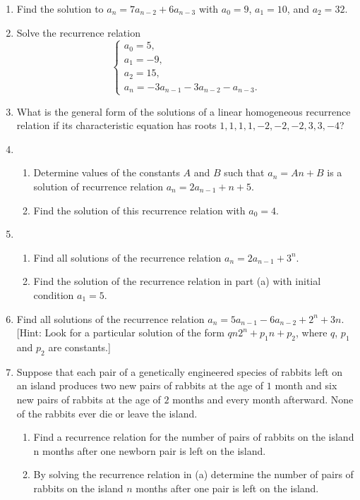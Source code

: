 \documentclass{../../cls/sig-alternate-05-2015}
\begin{document}
\begin{enumerate}
\item
Find the solution to $a_n=7a_{n-2}+6a_{n-3}$ with $a_0=9$, $a_1 = 10$, and $a_2=32$.

\item Solve the recurrence relation \begin{equation}
\begin{cases}
a_0 = 5,\\
a_1 = -9,\\
a_2 = 15,\\
a_n = -3a_{n-1} - 3a_{n-2} - a_{n-3}.
\end{cases}
\end{equation}

\item What is the general form of the solutions of a linear homogeneous recurrence relation if its characteristic equation
has roots $1, 1, 1, 1, -2, -2, -2, 3, 3, -4$?

\item \begin{enumerate}
    \item Determine values of the constants $A$ and $B$ such
    that $a_n = An + B$ is a solution of recurrence relation $a_n = 2a_{n - 1} + n + 5$.
    \item Find the solution of this recurrence relation with
    $a_0 = 4$.
\end{enumerate}

\item \begin{enumerate}
    \item Find all solutions of the recurrence relation
    $a_n = 2a_{n-1} + 3^n$.
    \item Find the solution of the recurrence relation in part (a)
    with initial condition $a_1 = 5$.
\end{enumerate}

\item Find all solutions of the recurrence relation 
$a_n = 5a_{n-1} - 6a_{n-2} + 2^n + 3n$. 
[Hint: Look for a particular
solution of the form $qn2^n + p_1n + p_2$, where $q$, $p_1$ and
$p_2$ are constants.]

\item Suppose that each pair of a genetically engineered species
of rabbits left on an island produces two new pairs of rabbits at the age of $1$ month and six new pairs of rabbits at
the age of $2$ months and every month afterward. None of
the rabbits ever die or leave the island.
\begin{enumerate}
    \item Find a recurrence relation for the number of pairs of
    rabbits on the island n months after one newborn pair
    is left on the island.
    \item By solving the recurrence relation in (a) determine
    the number of pairs of rabbits on the island $n$ months
    after one pair is left on the island.
\end{enumerate}


\end{enumerate}
\end{document}
